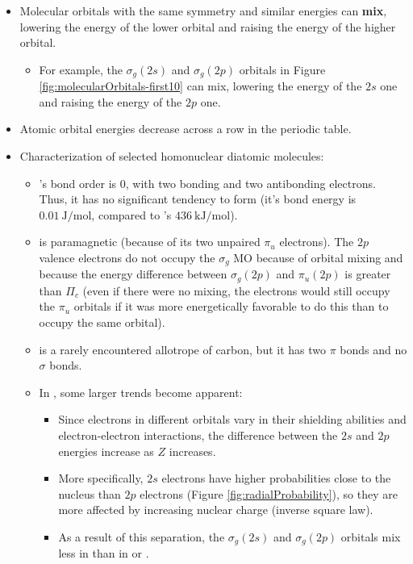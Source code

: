 \documentclass[../notes.tex]{subfiles}
\begin{document}
\begin{itemize}
\begin{itemize}
    \end{itemize}
    \item Molecular orbitals with the same symmetry and similar energies can \textbf{mix}, lowering the energy of the lower orbital and raising the energy of the higher orbital.
    \begin{itemize}
        \item For example, the $\sigma_g(2s)$ and $\sigma_g(2p)$ orbitals in Figure \ref{fig:molecularOrbitals-first10} can mix, lowering the energy of the $2s$ one and raising the energy of the $2p$ one.
    \end{itemize}
    \item {}Atomic orbital energies decrease across a row in the periodic table.
    \item Characterization of selected homonuclear diatomic molecules:
    \begin{itemize}
        \item {}'s bond order is 0, with two bonding and two antibonding electrons. Thus, it has no significant tendency to form (it's bond energy is $\SI[per-mode=symbol]{0.01}{\joule\per\mole}$, compared to 's $\SI[per-mode=symbol]{436}{\kilo\joule\per\mole}$).
        \item {} is paramagnetic (because of its two unpaired $\pi_u$ electrons). The $2p$ valence electrons do not occupy the $\sigma_g$ MO because of orbital mixing and because the energy difference between $\sigma_g(2p)$ and $\pi_u(2p)$ is greater than $\Pi_c$ (even if there were no mixing, the electrons would still occupy the $\pi_u$ orbitals if it was more energetically favorable to do this than to occupy the same orbital).
        \item {} is a rarely encountered allotrope of carbon, but it has two $\pi$ bonds and no $\sigma$ bonds.
        \item In , some larger trends become apparent:
        \begin{itemize}
            \item Since electrons in different orbitals vary in their shielding abilities and electron-electron interactions, the difference between the $2s$ and $2p$ energies increase as $Z$ increases.
            \item More specifically, $2s$ electrons have higher probabilities close to the nucleus than $2p$ electrons (Figure \ref{fig:radialProbability}), so they are more affected by increasing nuclear charge (inverse square law).
            \item As a result of this separation, the $\sigma_g(2s)$ and $\sigma_g(2p)$ orbitals mix less in  than in  or .

\end{itemize}
\end{itemize}
\end{itemize}
\end{document}
